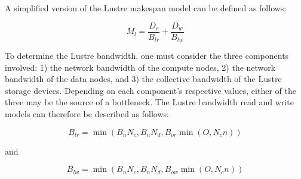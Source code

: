 \documentclass{report}
\begin{document}
    A simplified version of the Lustre makespan model can be defined as follows:

    \begin{equation}\label{eq:lustrenpc}
        M_{l} =  \frac{D_{r}}{B_{lr}} + \frac{D_{w}}{B_{lw}}
    \end{equation}


    To determine the Lustre bandwidth, one must consider the three components involved:
1) the network bandwidth of the compute nodes, 2) the network bandwidth of the data nodes,
and 3) the collective bandwidth of the Lustre storage devices. Depending on each component's
respective values, either of the three may be the source of a bottleneck. The
Lustre bandwidth read and write models can therefore be described as follows:

    \begin{equation}\label{eq:blr}
        B_{lr} = \min{(B_{n}N_{c}, B_{n}N_{d}, B_{or}\min{(O, N_{c}n)})}
    \end{equation}

    and

    \begin{equation}\label{eq:blw}
        B_{lw} = \min{(B_{n}N_{c}, B_{n}N_{d}, B_{ow}\min{(O, N_{c}n)})}
    \end{equation}

\end{document}
